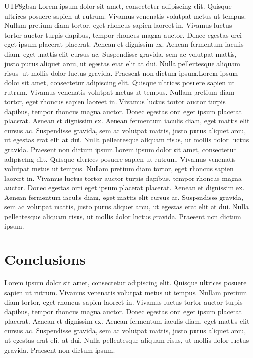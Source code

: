 \documentclass[11pt]{article}
\begin{document}
\begin{CJK}{UTF8}{gbsn}
Lorem ipsum dolor sit amet, consectetur adipiscing elit. Quisque
ultrices posuere sapien ut rutrum. Vivamus venenatis volutpat metus ut
tempus. Nullam pretium diam tortor, eget rhoncus sapien laoreet in.
Vivamus luctus tortor auctor turpis dapibus, tempor rhoncus magna
auctor. Donec egestas orci eget ipsum placerat placerat. Aenean et
dignissim ex. Aenean fermentum iaculis diam, eget mattis elit cursus ac.
Suspendisse gravida, sem ac volutpat mattis, justo purus aliquet arcu,
ut egestas erat elit at dui. Nulla pellentesque aliquam risus, ut mollis
dolor luctus gravida. Praesent non dictum ipsum.Lorem ipsum dolor sit
amet, consectetur adipiscing elit. Quisque ultrices posuere sapien ut
rutrum. Vivamus venenatis volutpat metus ut tempus. Nullam pretium diam
tortor, eget rhoncus sapien laoreet in. Vivamus luctus tortor auctor
turpis dapibus, tempor rhoncus magna auctor. Donec egestas orci eget
ipsum placerat placerat. Aenean et dignissim ex. Aenean fermentum
iaculis diam, eget mattis elit cursus ac. Suspendisse gravida, sem ac
volutpat mattis, justo purus aliquet arcu, ut egestas erat elit at dui.
Nulla pellentesque aliquam risus, ut mollis dolor luctus gravida.
Praesent non dictum ipsum.Lorem ipsum dolor sit amet, consectetur
adipiscing elit. Quisque ultrices posuere sapien ut rutrum. Vivamus
venenatis volutpat metus ut tempus. Nullam pretium diam tortor, eget
rhoncus sapien laoreet in. Vivamus luctus tortor auctor turpis dapibus,
tempor rhoncus magna auctor. Donec egestas orci eget ipsum placerat
placerat. Aenean et dignissim ex. Aenean fermentum iaculis diam, eget
mattis elit cursus ac. Suspendisse gravida, sem ac volutpat mattis,
justo purus aliquet arcu, ut egestas erat elit at dui. Nulla
pellentesque aliquam risus, ut mollis dolor luctus gravida. Praesent non
dictum ipsum.

\section*{Conclusions}\label{conclusions}

Lorem ipsum dolor sit amet, consectetur adipiscing elit. Quisque
ultrices posuere sapien ut rutrum. Vivamus venenatis volutpat metus ut
tempus. Nullam pretium diam tortor, eget rhoncus sapien laoreet in.
Vivamus luctus tortor auctor turpis dapibus, tempor rhoncus magna
auctor. Donec egestas orci eget ipsum placerat placerat. Aenean et
dignissim ex. Aenean fermentum iaculis diam, eget mattis elit cursus ac.
Suspendisse gravida, sem ac volutpat mattis, justo purus aliquet arcu,
ut egestas erat elit at dui. Nulla pellentesque aliquam risus, ut mollis
dolor luctus gravida. Praesent non dictum ipsum.


\end{CJK}
\end{document}
